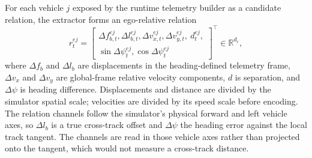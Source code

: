 \documentclass[journal]{IEEEtran}
\begin{document}
For each vehicle $j$ exposed by the runtime telemetry builder as a candidate
relation, the extractor forms an ego-relative relation
\begin{equation}
 r_t^{ej}=\left[\begin{array}{c}
 \Delta f_{b,t}^{ej},\Delta l_{b,t}^{ej},\Delta v_{x,t}^{ej},\Delta v_{y,t}^{ej},\ d_t^{ej},\\
 \sin\Delta\psi_t^{ej},\cos\Delta\psi_t^{ej}
 \end{array}\right]^\top\in\mathbb R^{d_r},
\label{eq:relation_vector}
\end{equation}
where $\Delta f_b$ and $\Delta l_b$ are displacements in the heading-defined
telemetry frame,
$\Delta v_x$ and $\Delta v_y$ are global-frame relative velocity components,
$d$ is separation, and $\Delta\psi$ is heading difference. Displacements and
distance are divided by the simulator spatial scale; velocities are divided
by its speed scale before encoding. The relation channels follow the
simulator's physical forward and left vehicle axes, so $\Delta l_b$ is a true
cross-track offset and $\Delta\psi$ the heading error against the local track
tangent. The channels are read in those vehicle axes rather than projected onto
the tangent, which would not measure a cross-track distance.
\end{document}
